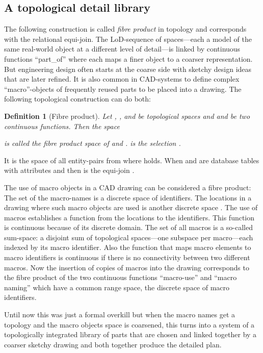 \documentclass[5p]{elsarticle}
\newtheorem{dfn}{Definition}
\newcommand{\qq}[1]{``#1''}
\begin{document}
\subsection{A topological detail library} 

The following construction is called \emph{fibre product} in topology and corresponds 
with the relational equi-join. 
The LoD-sequence of spaces---each a model of the same real-world object at a 
different level of detail---is linked by continuous functions \qq{part\_of} where each 
maps a finer object to a coarser representation. 
But engineering design often starts at the coarse side with sketchy design ideas that are 
later refined. 
It is also common in CAD-systems to define complex \qq{macro}-objects of 
frequently reused parts to be placed into a drawing. 
The following topological construction can do both: 

\begin{sloppy} \begin{dfn}[Fibre product]
Let , , and  be topological spaces and 
  and  be two 
continuous functions. 
Then the space 

is called the \emph{fibre product space} of  and .  is the selection 
.
\end{dfn}
\end{sloppy} 

It is the space of all entity-pairs  from  where  holds. 
When  and  are database tables with attributes  and  then  is the 
equi-join .

The use of macro objects in a CAD drawing can be considered a fibre product: 
The set of the macro-names is a discrete space  of identifiers.  
The locations in a drawing where such macro objects are used is another discrete space . 
The use of macros establishes a function  from the locations to the identifiers. 
This function is continuous because of its discrete domain. 
The set of all macros  is a so-called sum-space: a disjoint sum of topological spaces---one 
subspace per macro---each indexed by its macro identifier. 
Also the function  that maps macro elements to macro identifiers is continuous if 
there is no connectivity between two different macros. 
Now the insertion of copies of macros into the drawing corresponds to the fibre product of the 
two continuous functions \qq{macro-use}  and \qq{macro naming}  which have a common range 
space, the discrete space  of macro identifiers. 

Until now this was just a formal overkill but when the macro names get a topology and 
the macro objects space is coarsened, this turns into a system of a topologically integrated 
library of parts that are chosen and linked together by a coarser sketchy drawing and both 
together produce the detailed plan. 
\end{document}
